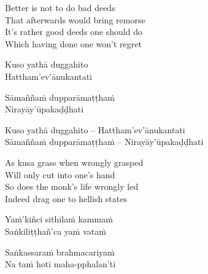 \fi

\begin{english-verses}
  Better is not to do bad deeds\\
  That afterwards would bring remorse\\
  It's rather good deeds one should do\\
  Which having done one won't regret
\end{english-verses}

\ifbfive\clearpage\fi

\ifninebythirteen

\begin{pali-hang-verses}
  Kuso yathā duggahito\\
  Hattham'ev'ānukantati
\end{pali-hang-verses}
\begin{pali-hang-together}
  Sāmaññaṁ dupparāmaṭṭhaṁ\\
  Nirayāy'ūpakaḍḍhati
\end{pali-hang-together}

\else

\begin{verses}
  Kuso yathā duggahito – Hattham'ev'ānukantati\\
  Sāmaññaṁ dupparāmaṭṭhaṁ – Nirayāy'ūpakaḍḍhati
\end{verses}

\fi

\ifafive\clearpage\fi

\begin{english-verses}
  As kusa grass when wrongly grasped\\
  Will only cut into one's hand\\
  So does the monk's life wrongly led\\
  Indeed drag one to hellish states
\end{english-verses}

\ifninebythirteen

\clearpage

\begin{pali-hang-verses}
  Yaṁ'kiñci sithilaṁ kammaṁ\\
  Saṅkiliṭṭhañ'ca yaṁ vataṁ
\end{pali-hang-verses}
\begin{pali-hang-together}
  Saṅkassaraṁ brahmacariyaṁ\\
  Na taṁ hoti maha-pphalan'ti
\end{pali-hang-together}

\else

